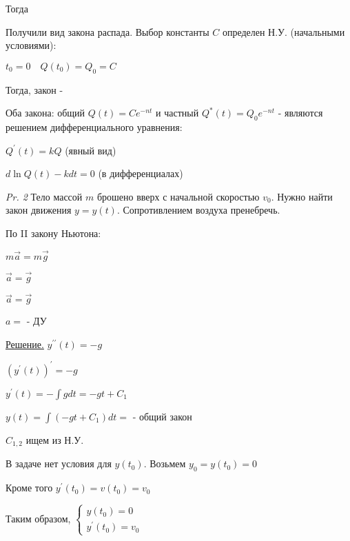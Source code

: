 \documentclass[12pt]{article}
\begin{document}
    \vspace{5mm}

    Тогда 

    \vspace{5mm}

    Получили вид закона распада. Выбор константы $C$ определен Н.У. (начальными условиями):

    $t_0 = 0 \quad Q(t_0) = Q_0 = C$

    Тогда, закон - 

    \Nota Оба закона: общий $Q(t) = Ce^{-nt}$ и частный $Q^*(t) = Q_0 e^{-nt}$ -
    являются решением дифференциального уравнения:

    $Q^\prime(t) = kQ$  (явный вид)

    $d \ln Q(t) - kdt = 0$ (в дифференциалах)

    \vspace{5mm}

    \hypertarget{freefallingbodyproblem}{}

    \textit{Pr. 2} \quad Тело массой $m$ брошено вверх с начальной скоростью $v_0$. Нужно найти закон движения $y = y(t)$.
    Сопротивлением воздуха пренебречь.

    По II закону Ньютона:

    $m\overrightarrow{a} = m\overrightarrow{g}$

    $\overrightarrow{a} = \overrightarrow{g}$

    $\overrightarrow{a} = \overrightarrow{g}$

    $a = $ - ДУ

    \underline{Решение.} \quad $y^{\prime\prime}(t) = -g$

    $(y^{\prime}(t))^\prime = -g$

    $y^{\prime}(t) = -\int g dt = -gt + C_1$

    $y(t) = \int (-gt + C_1) dt = $ - общий закон

    $C_{1,2}$ ищем из Н.У.

    В задаче нет условия для $y(t_0)$. Возьмем $y_0 = y(t_0) = 0$

    Кроме того $y^\prime(t_0) = v(t_0) = v_0$

    Таким образом, $\begin{cases}y(t_0) = 0 \\ y^\prime(t_0) = v_0\end{cases}$
\end{document}
